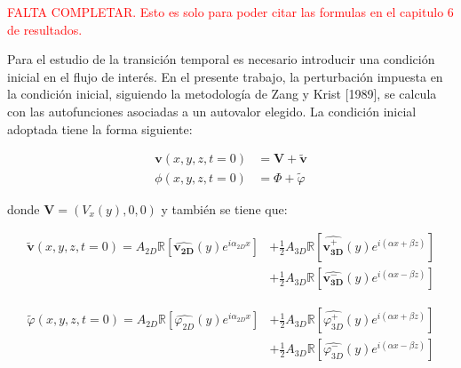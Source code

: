 \textcolor{red}{FALTA COMPLETAR. Esto es solo para poder citar las formulas en el capitulo 6 de resultados.}

Para el estudio de la transición temporal es necesario introducir una condición inicial en el flujo de interés. En el presente trabajo, la perturbación impuesta en la condición inicial, siguiendo la metodología de Zang y Krist [1989], se calcula con las autofunciones asociadas a un autovalor elegido. La condición inicial adoptada tiene la forma siguiente: 

\begin{equation}
\begin{aligned}
\mathbf{v}(x,y,z,t=0) &= \mathbf{V} + \widetilde{\mathbf{v}} \\
\phi(x,y,z,t=0) &= \Phi +  \widetilde{\varphi} 
\end{aligned}
\label{eq:init_con_1}
\end{equation}

donde $\mathbf{V}=(V_x(y),0,0)$ y también se tiene que:

\begin{equation}
\begin{aligned}
\widetilde{\mathbf{v}}(x,y,z,t=0) = A_{2D} \mathbb{R} \left[ \widehat{\mathbf{v^{}_{2D}}}(y) e^{\mathit{i} \alpha_{2D} x} \right] &+ \frac{1}{2} A_{3D} \mathbb{R} \left[ \widehat{\mathbf{v^{+}_{3D}}}(y) e^{\mathit{i} ( \alpha x + \beta z)} \right] \\
 &+ \frac{1}{2} A_{3D} \mathbb{R} \left[ \widehat{\mathbf{v^{-}_{3D}}}(y) e^{\mathit{i} ( \alpha x - \beta z)} \right]
\end{aligned}
\label{eq:init_con_2}
\end{equation}

\begin{equation}
\begin{aligned}
\widetilde{\varphi}(x,y,z,t=0) = A_{2D} \mathbb{R} \left[ \widehat{\varphi^{}_{2D}}(y) e^{\mathit{i} \alpha_{2D} x} \right] &+ \frac{1}{2} A_{3D} \mathbb{R} \left[ \widehat{\varphi^{+}_{3D}}(y) e^{\mathit{i} ( \alpha x + \beta z)} \right] \\
 &+ \frac{1}{2} A_{3D} \mathbb{R} \left[ \widehat{\varphi^{-}_{3D}}(y) e^{\mathit{i} ( \alpha x - \beta z)} \right]
\end{aligned}
\label{eq:init_con_3}
\end{equation}
